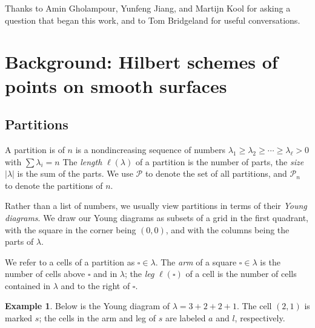 \documentclass{amsart}[12pt]
\theoremstyle{definition}
\newtheorem{example}[dummy]{Example}
\newcommand{\PP}{\mathcal{P}} %
\begin{document}
Thanks to Amin Gholampour, Yunfeng Jiang, and Martijn Kool for asking a question that began this work, and to Tom Bridgeland for useful conversations.



\section{Background: Hilbert schemes of points on smooth surfaces}

\subsection{Partitions}


A partition is of $n$ is a nondincreasing sequence of numbers $\lambda_1\geq \lambda_2\geq \cdots \geq \lambda_\ell > 0$ with $\sum \lambda_i=n$  The \emph{length} $\ell(\lambda)$ of a partition is the number of parts, the \emph{size} $|\lambda|$ is the sum of the parts.  We use $\PP$ to denote the set of all partitions, and $\PP_n$ to denote the partitions of $n$.

Rather than a list of numbers, we usually view partitions in terms of their \emph{Young diagrams}.  We draw our Young diagrams as subsets of a grid in the first quadrant, with the square in the corner being $(0,0)$, and with the columns being the parts of $\lambda$.  

We refer to a cells of a partition as $\square\in\lambda$.  The \emph{arm} of a square $\square\in\lambda$ is the number of cells above $\square$ and in $\lambda$; the \emph{leg} $\ell(\square)$ of a cell is the number of cells contained in $\lambda$ and to the right of $\square$.

\begin{example}
Below is the Young diagram of $\lambda=3+2+2+1$.  The cell $(2,1)$ is marked $s$; the cells in the arm and leg of $s$ are labeled $a$ and $l$, respectively.
\begin{center}
\end{center}
\end{example}
\end{document}
